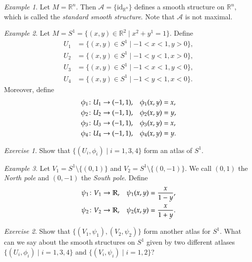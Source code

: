\documentclass[11pt]{amsart}
\numberwithin{equation}{section}
\theoremstyle{plain}
\theoremstyle{definition}
\theoremstyle{remark}
\newtheorem{exe}{Exercise}[subsection]
\newtheorem{ex}{Example}[subsection]
\newcommand{\R}{\mathbb{R}}
\newcommand{\id}{\mathrm{id}}
\newcommand{\calA}{\mathcal{A}}
\begin{document}
\begin{ex}
Let $M=\R^n$. Then $\calA=\{\id_{\R^n}\}$ defines a smooth structure on $\R^n$, which is called the \emph{standard smooth structure}. Note that $\calA$ is not maximal.
\end{ex}


\begin{ex}
Let $M=S^1=\{(x,y)\in\R^2\mid x^2+y^1=1\}$. Define 
\begin{align*}
U_1&=\{(x,y)\in S^1\mid -1<x<1,y>0\},\\
U_2&=\{(x,y)\in S^1\mid -1<y<1,x>0\},\\
U_3&=\{(x,y)\in S^1\mid -1<x<1,y<0\},\\
U_4&=\{(x,y)\in S^1\mid -1<y<1,x<0\}.
\end{align*}
Moreover, define
\begin{align*}
\phi_1\colon U_1&\to (-1,1),\hspace{0.3cm}\phi_1(x,y)=x,\\
\phi_2\colon U_2&\to (-1,1),\hspace{0.3cm}\phi_2(x,y)=y,\\
\phi_3\colon U_3&\to (-1,1),\hspace{0.3cm}\phi_3(x,y)=x,\\
\phi_4\colon U_4&\to (-1,1),\hspace{0.3cm}\phi_4(x,y)=y.\\
\end{align*}
\end{ex}


\begin{exe}
Show that $\{(U_i,\phi_i)\mid i=1,3,4\}$ form an atlas of $S^1$.
\end{exe}

\begin{ex}
Let $V_1=S^1\setminus\{(0,1)\}$ and $V_2=S^1\setminus\{(0,-1)\}$. We call $(0,1)$ the \emph{North pole} and $(0,-1)$ the \emph{South pole}. Define 
\begin{align*}
\psi_1\colon V_1&\to \R, \hspace{0.3cm}\psi_1(x,y)=\frac{x}{1-y},\\
\psi_2\colon V_2&\to \R, \hspace{0.3cm}\psi_2(x,y)=\frac{x}{1+y}.
\end{align*}
\end{ex}

\begin{exe}
Show that $\{(V_1,\psi_1),(V_2,\psi_2)\}$ form another atlas for $S^1$. What can we say about the smooth structures on $S^1$ given by two different atlases $\{(U_i,\phi_i)\mid i=1,3,4\}$ and $\{(V_i,\psi_i)\mid i=1,2\}$?
\end{exe}
\end{document}
